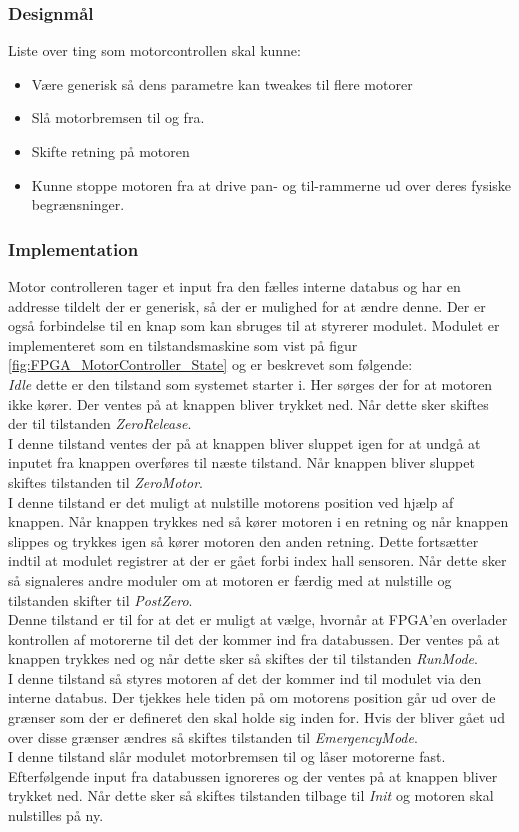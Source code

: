 \subsubsection{Designmål}
Liste over ting som motorcontrollen skal kunne:
\begin{itemize}
	\item Være generisk så dens parametre kan tweakes til flere motorer
	\item Slå motorbremsen til og fra.
	\item Skifte retning på motoren
	\item Kunne stoppe motoren fra at drive pan- og til-rammerne ud over deres fysiske begrænsninger.
\end{itemize}

\subsubsection{Implementation}
Motor controlleren tager et input fra den fælles interne databus og har en addresse tildelt der er generisk, så der er mulighed for at ændre denne. Der er også forbindelse til en knap som kan sbruges til at styrerer modulet. Modulet er implementeret som en tilstandsmaskine som vist på figur \ref{fig:FPGA_MotorController_State} og er beskrevet som følgende:\\
\textit{Idle} dette er den tilstand som systemet starter i. Her sørges der for at motoren ikke kører. Der ventes på at knappen bliver trykket ned. Når dette sker skiftes der til tilstanden \textit{ZeroRelease}.\\
I denne tilstand ventes der på at knappen bliver sluppet igen for at undgå at inputet fra knappen overføres til næste tilstand. Når knappen bliver sluppet skiftes tilstanden til \textit{ZeroMotor}.\\ 
I denne tilstand er det muligt at nulstille motorens position ved hjælp af knappen. Når knappen trykkes ned så kører motoren i en retning og når knappen slippes og trykkes igen så kører motoren den anden retning. Dette fortsætter indtil at modulet registrer at der er gået forbi index hall sensoren. Når dette sker så signaleres andre moduler om at motoren er færdig med at nulstille og tilstanden skifter til \textit{PostZero}.\\
Denne tilstand er til for at det er muligt at vælge, hvornår at FPGA'en overlader kontrollen af motorerne til det der kommer ind fra databussen. Der ventes på at knappen trykkes ned og når dette sker så skiftes der til tilstanden \textit{RunMode}. \\
I denne tilstand så styres motoren af det der kommer ind til modulet via den interne databus. Der tjekkes hele tiden på om motorens position går ud over de grænser som der er defineret den skal holde sig inden for. Hvis der bliver gået ud over disse grænser ændres så skiftes tilstanden til \textit{EmergencyMode}.\\
I denne tilstand slår modulet motorbremsen til og låser motorerne fast. Efterfølgende input fra databussen ignoreres og der ventes på at knappen bliver trykket ned. Når dette sker så skiftes tilstanden tilbage til \textit{Init} og motoren skal nulstilles på ny.

